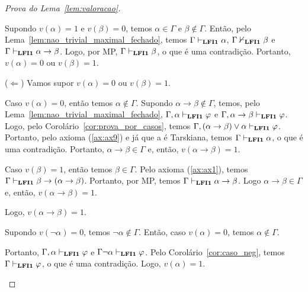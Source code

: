 \begin{proof}[Prova do Lema~\ref{lem:valoracao}]
\begin{provaporcasos}
\begin{adjustwidth}{1cm}{}
                            \noindent Supondo $v(\alpha) = 1$ e $v(\beta) = 0$, temos $\alpha \in \Gamma$ e $\beta \not \in \Gamma$. Então, pelo Lema~\ref{lem:nao_trivial_maximal_fechado}, temos $\Gamma \vdash_{{\normalfont\textbf{LFI1}}{}} \alpha$, $\Gamma \nvdash_{{\normalfont\textbf{LFI1}}{}} \beta$ e $\Gamma \vdash_{{\normalfont\textbf{LFI1}}{}} \alpha \to \beta$. Logo, por MP, $\Gamma \vdash_{{\normalfont\textbf{LFI1}}{}} \beta$, o que é uma contradição. Portanto, $v(\alpha) = 0$ ou $v(\beta) = 1$.

                            \noindent ($\Longleftarrow$) Vamos supor $v(\alpha) = 0$ ou $v(\beta) = 1$.

                            \noindent Caso $v(\alpha) = 0$, então temos $\alpha \not \in \Gamma$. Supondo $\alpha \to \beta \not \in \Gamma$, temos, pelo Lema~\ref{lem:nao_trivial_maximal_fechado}, $\Gamma, \alpha \vdash_{{\normalfont\textbf{LFI1}}{}} \varphi$ e $\Gamma, \alpha \to \beta \vdash_{{\normalfont\textbf{LFI1}}{}} \varphi$. Logo, pelo Corolário~\ref{cor:prova_por_casos}, temos $\Gamma, (\alpha \to \beta) \lor \alpha \vdash_{{\normalfont\textbf{LFI1}}{}} \varphi$. Portanto, pelo axioma (\ref{ax:ax9}) e já que a \lfium{} é Tarskiana, temos $\Gamma \vdash_{{\normalfont\textbf{LFI1}}{}} \alpha$, o que é uma contradição. Portanto, $\alpha \to \beta \in \Gamma$ e, então, $v(\alpha \to \beta) = 1$.

                            \noindent Caso $v(\beta) = 1$, então temos $\beta \in \Gamma$. Pelo axioma (\ref{ax:ax1}), temos $\Gamma \vdash_{{\normalfont\textbf{LFI1}}{}} \beta \to (\alpha \to \beta)$. Portanto, por MP, temos $\Gamma \vdash_{{\normalfont\textbf{LFI1}}{}} \alpha \to \beta$. Logo $\alpha \to \beta \in \Gamma$ e, então, $v(\alpha \to \beta) = 1$.

                            \noindent Logo, $v(\alpha \to \beta) = 1$.

                        \end{adjustwidth}

                        
                        \begin{adjustwidth}{1cm}{}
                            \noindent Supondo $v(\neg \alpha) = 0$, temos $\neg \alpha \not \in \Gamma$. Então, caso $v(\alpha) = 0$, temos $\alpha \not \in \Gamma$. 
                            
                            \noindent Portanto, $\Gamma, \alpha \vdash_{{\normalfont\textbf{LFI1}}{}} \varphi$ e $\Gamma \neg \alpha \vdash_{{\normalfont\textbf{LFI1}}{}} \varphi$. Pelo Corolário~\ref{cor:caso_neg}, temos $\Gamma \vdash_{{\normalfont\textbf{LFI1}}{}} \varphi$, o que é uma contradição. Logo, $v(\alpha) = 1$.

                        \end{adjustwidth}


\end{provaporcasos}
\end{proof}
